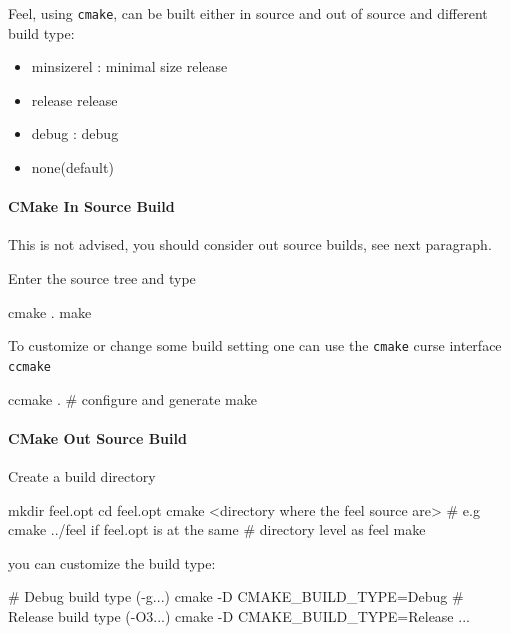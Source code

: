 \documentclass[a4paper]{book}
\newcommand{\feel}{Feel\xspace}
\newcommand{\cmake}{\texttt{cmake}\xspace}
\newcommand{\ccmake}{\texttt{ccmake}\xspace}
\begin{document}
\feel, using \cmake, can be built either in source and out of source and different
build type:
\begin{itemize}
\item minsizerel : minimal size release
\item release release
\item debug : debug
\item none(default)
\end{itemize}

\paragraph{CMake In Source Build}

This is not advised, you should consider out source builds, see next paragraph.

Enter the source tree and type
\begin{unixcom}
  cmake .
  make
\end{unixcom}

To customize or change some build setting one can use the \cmake curse interface
\ccmake
\begin{unixcom}
  ccmake . # configure and generate
  make
\end{unixcom}

\paragraph{CMake Out Source Build}

Create a build directory
\begin{unixcom}
  mkdir feel.opt
  cd feel.opt
  cmake <directory where the feel source are>
  # e.g cmake ../feel if feel.opt is at the same
  # directory level as feel
  make
\end{unixcom}

you can customize the build type:
\begin{unixcom}
  # Debug build type (-g...)
  cmake -D CMAKE_BUILD_TYPE=Debug
  # Release build type (-O3...)
  cmake -D CMAKE_BUILD_TYPE=Release
  ...
\end{unixcom}



\end{document}
